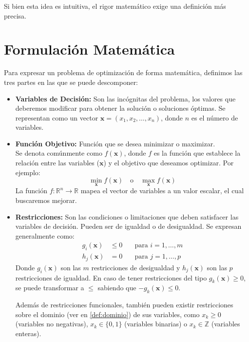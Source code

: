 \documentclass[12pt,a4paper]{book}
\begin{document}
Si bien esta idea es intuitiva, el rigor matemático exige una definición más precisa.

\section{Formulación Matemática}

Para expresar un problema de optimización de forma matemática, definimos las tres partes en las que se puede descomponer:

\begin{itemize}
    \item \textbf{Variables de Decisión:} Son las incógnitas del problema, los valores que deberemos modificar para obtener la solución o soluciones óptimas. Se representan como un vector $\mathbf{x} = (x_1, x_2, \ldots, x_n)$, donde $n$ es el número de variables.

    \item \textbf{Función Objetivo:} Función que se desea minimizar o maximizar.\\
    Se denota comúnmente como $f(\mathbf{x})$, donde $f$ es la función que establece la relación entre las variables ($\mathbf{x}$) y el objetivo que deseamos optimizar.
    Por ejemplo:
    $$ \min_{\mathbf{x}} f(\mathbf{x}) \quad \text{o} \quad \max_{\mathbf{x}} f(\mathbf{x}) $$
    La función $f: \mathbb{R}^n \to \mathbb{R}$ mapea el vector de variables a un valor escalar, el cual buscaremos mejorar.

    \item \textbf{Restricciones:} Son las condiciones o limitaciones que deben satisfacer las variables de decisión. Pueden ser de igualdad o de desigualdad. Se expresan generalmente como:
    \begin{align*}
        g_i(\mathbf{x}) &\le 0 & \quad \text{para } i = 1, \ldots, m \\
        h_j(\mathbf{x}) &= 0 & \quad \text{para } j = 1, \ldots, p
    \end{align*}
    Donde $g_i(\mathbf{x})$ son las $m$ restricciones de desigualdad y $h_j(\mathbf{x})$ son las $p$ restricciones de igualdad.
    En caso de tener restricciones del tipo $g_k(\mathbf{x})\geq0$, se puede transformar a $\leq$ sabiendo que $-g_k(\mathbf{x}) \leq 0$.
    
    Además de restricciones funcionales, también pueden existir restricciones sobre el dominio (ver en \ref{def:dominio}) de sus variables, como $x_k \ge 0$ (variables no negativas),  $x_k \in \{0,1\}$ (variables binarias) o $x_k \in \mathbb{Z}$ (variables enteras).
\end{itemize}
\end{document}
